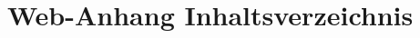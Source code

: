 \documentclass[
	a4paper
]{scrartcl}
\begin{document}
\chapter*{Web-Anhang Inhaltsverzeichnis}

\end{document}
